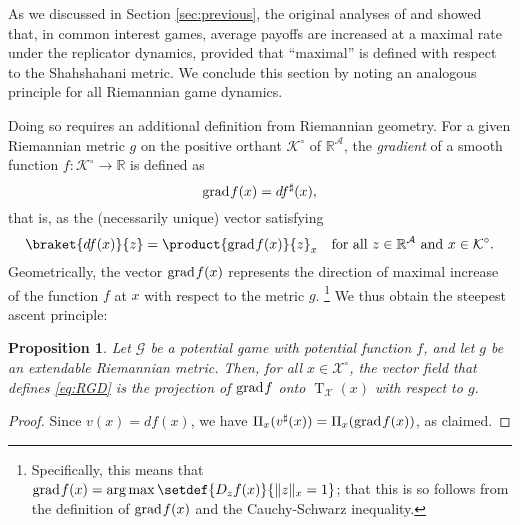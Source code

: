 \documentclass[reqno]{amsart}
\DeclarePairedDelimiter{\norm}{\lVert}{\rVert}
\theoremstyle{plain}
\newtheorem{proposition}[theorem]{Proposition}
\theoremstyle{definition}
\theoremstyle{remark}
\numberwithin{equation}{section}
\numberwithin{theorem}{section}
\begin{document}
As we discussed in Section \ref{sec:previous}, the original analyses of \cite{Kim58} and \cite{Sha79} showed that, in common interest games, average payoffs are increased at a maximal rate under the replicator dynamics, provided that ``maximal'' is defined with respect to the Shahshahani metric.
We conclude this section by noting an analogous principle for all Riemannian game dynamics.

Doing so requires an additional definition from Riemannian geometry.
For a given Riemannian metric $g$ on the positive orthant ${{\mathcal{K}}^{\circ}}$ of ${\mathbb{R}}^{\mathcal{A}}$, the \emph{gradient} of a smooth function $f{\colon}{{\mathcal{K}}^{\circ}} \to {\mathbb{R}}$ is defined as
\begin{equation}
\label{eq:gradient}
\operatorname{grad\hspace{-1pt}} f(x)
	= df^{\sharp}(x),
\end{equation}
that is, as the (necessarily unique) vector satisfying
\begin{equation}
\braket{df(x)}{z}
	= \product{\operatorname{grad\hspace{-1pt}} f(x)}{z}_x 
	\quad
	\text{for all $z\in {\mathbb{R}}^{\mathcal{A}}$ and $x\in{{\mathcal{K}}^{\circ}}$}.
\end{equation}
Geometrically, the vector $\operatorname{grad\hspace{-1pt}} f(x)$ represents the direction of maximal increase of the function $f$ at $x$ with respect to the metric $g$.
\footnote{Specifically, this means that $\operatorname{grad\hspace{-1pt}} f(x) = \operatorname*{arg\,max}\setdef{D_{z}f(x)}{\norm{z}_{x} = 1}$;
that this is so follows from the definition of $\operatorname{grad\hspace{-1pt}} f(x)$ and the Cauchy-Schwarz inequality.}
We thus obtain the steepest ascent principle:

\begin{proposition}
Let ${\mathcal{G}}$ be a potential game with potential function ${f}$, and let $g$ be an extendable Riemannian metric.
Then, for all $x\in{{\mathcal{X}}^{\circ}}$, the vector field that defines \eqref{eq:RGD} is the projection of $\operatorname{grad\hspace{-1pt}}{f}$  onto $\operatorname{T}_{\mathcal{X}}(x)$ with respect to $g$.
\end{proposition}

\begin{proof}
Since ${v}(x) = df(x)$, we have $\operatorname{\Pi}_{x}({v}^{\sharp}(x)) = \operatorname{\Pi}_{x}(\operatorname{grad\hspace{-1pt}} f(x))$, as claimed.
\end{proof}
\end{document}
